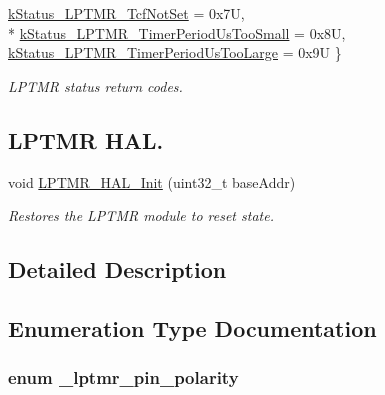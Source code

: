 \begin{DoxyCompactItemize}
\hyperlink{group__lptmr__hal_ggaa52fc547656e966381f441688c605210a8c576146705affb8b1b5c6c19bd35aec}{k\+Status\+\_\+\+L\+P\+T\+M\+R\+\_\+\+Tcf\+Not\+Set} = 0x7U, 
\\*
\hyperlink{group__lptmr__hal_ggaa52fc547656e966381f441688c605210aa23b1d79baefedbd78d76f295af90384}{k\+Status\+\_\+\+L\+P\+T\+M\+R\+\_\+\+Timer\+Period\+Us\+Too\+Small} = 0x8U, 
\hyperlink{group__lptmr__hal_ggaa52fc547656e966381f441688c605210a974f06996b15faf23b56b73bc38783fb}{k\+Status\+\_\+\+L\+P\+T\+M\+R\+\_\+\+Timer\+Period\+Us\+Too\+Large} = 0x9U
 \}\begin{DoxyCompactList}\small\item\em L\+P\+T\+MR status return codes. \end{DoxyCompactList}
\end{DoxyCompactItemize}
\subsection*{L\+P\+T\+MR H\+AL.}
\begin{DoxyCompactItemize}
\item 
void \hyperlink{group__lptmr__hal_ga67552dcbb851f788af04f41d4a6fcca6}{L\+P\+T\+M\+R\+\_\+\+H\+A\+L\+\_\+\+Init} (uint32\+\_\+t base\+Addr)
\begin{DoxyCompactList}\small\item\em Restores the L\+P\+T\+MR module to reset state. \end{DoxyCompactList}\end{DoxyCompactItemize}


\subsection{Detailed Description}


\subsection{Enumeration Type Documentation}
\subsubsection[{\texorpdfstring{\+\_\+lptmr\+\_\+pin\+\_\+polarity}{_lptmr_pin_polarity}}]{\setlength{\rightskip}{0pt plus 5cm}enum {\bf \+\_\+lptmr\+\_\+pin\+\_\+polarity}}\hypertarget{group__lptmr__hal_ga9bd2404c984ac5eea420a396e7cdda77}{}\label{group__lptmr__hal_ga9bd2404c984ac5eea420a396e7cdda77}


